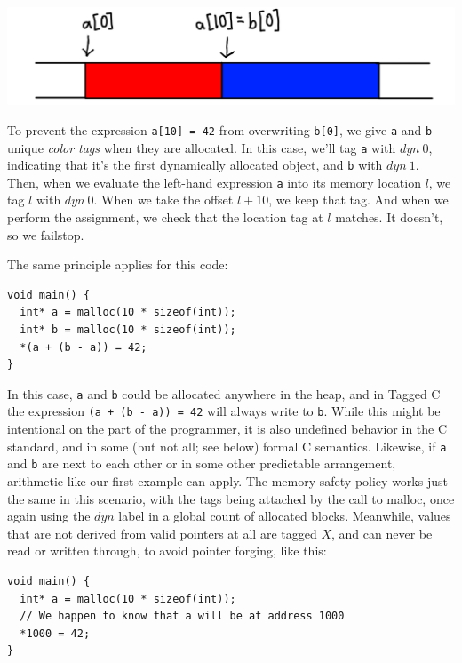 \documentclass[acmsmall,review,anonymous]{acmart}\settopmatter{printfolios=true,printccs=false,printacmref=false}
\begin{document}
\includegraphics[width=.5\textwidth]{example.png}

To prevent the expression {\tt a[10] = 42} from overwriting {\tt b[0]}, we give {\tt a} and {\tt b}
unique {\it color tags} when they are allocated. In this case, we'll tag {\tt a} with \(\mathit{dyn ~ 0}\),
indicating that it's the first dynamically allocated object, and {\tt b} with \(\mathit{dyn ~ 1}\).
Then, when we evaluate the left-hand expression {\tt a} into its memory location \(l\), we tag
\(l\) with \(\mathit{dyn ~ 0}\). When we take the offset \(l + 10\), we keep that tag. And when we
perform the assignment, we check that the location tag at \(l\) matches. It doesn't, so we failstop.

The same principle applies for this code:

\vspace{\abovedisplayskip}
\begin{verbatim}
void main() {
  int* a = malloc(10 * sizeof(int));
  int* b = malloc(10 * sizeof(int));
  *(a + (b - a)) = 42;
}
\end{verbatim}
\vspace{\belowdisplayskip}

In this case, {\tt a} and {\tt b} could be allocated anywhere in the heap, and in Tagged C
the expression {\tt *(a + (b - a)) = 42} will always write to {\tt *b}. While this might be intentional
on the part of the programmer, it is also undefined behavior in the C standard, and in some
(but not all; see below) formal C semantics. Likewise, if {\tt a} and {\tt b} are next to each other
or in some other predictable arrangement, arithmetic like our first example can apply.
The memory safety policy works just the same in this scenario, with the tags being attached
by the call to malloc, once again using the \(\mathit{dyn}\) label in a global count of allocated blocks.
Meanwhile, values that are not derived from valid pointers at all are tagged \(X\), and can never
be read or written through, to avoid pointer forging, like this:

\vspace{\abovedisplayskip}
\begin{verbatim}
void main() {
  int* a = malloc(10 * sizeof(int));
  // We happen to know that a will be at address 1000
  *1000 = 42;
}
\end{verbatim}
\vspace{\belowdisplayskip}
\end{document}
